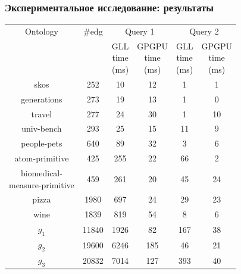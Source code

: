 \documentclass[xcolor=table]{beamer}
\begin{document}
\begin{frame}[fragile]
\transwipe[direction=90]
\frametitle{Экспериментальное исследование: результаты}
\centering
{}
\begin{tabular}{  c | c | c | c | c | c }
Ontology & \#edg & \multicolumn{2}{c|}{Query 1} & \multicolumn{2}{c}{Query 2} \\
\cline{3-6}
& & \shortstack{GLL \\ time \\ (ms)} & \shortstack{GPGPU \\ time \\ (ms)}  & \shortstack{GLL \\ time \\ (ms)} & \shortstack{GPGPU \\ time \\ (ms)} \\
\hline 
\hline
skos        & 252    & 10   & 12  & 1   & 1 \\
generations & 273    & 19   & 13  & 1   & 0 \\
travel      & 277    & 24   & 30  & 1   & 10 \\
univ-bench  & 293    & 25   & 15  & 11  & 9 \\
people-pets & 640    & 89   & 32  & 3   & 6 \\
atom-primitive 
            & 425    & 255  & 22  & 66  & 2 \\
\shortstack{biomedical- \\ measure-primitive} 
            & 459    & 261  & 20  & 45  & 24 \\
pizza       & 1980   & 697  & 24  & 29  & 23 \\
wine        & 1839   & 819  & 54  & 8   & 6 \\
$g_{1}$     & 11840  & 1926 & 82  & 167 & 38\\
$g_{2}$     & 19600  & 6246 & 185 & 46  & 21\\
$g_{3}$     & 20832  & 7014 & 127 & 393 & 40\\

\end{tabular}

\end{frame}
\end{document}
